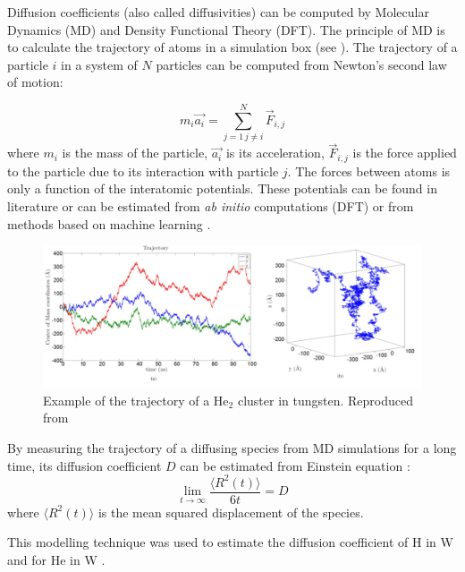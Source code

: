 Diffusion coefficients (also called diffusivities) can be computed by Molecular Dynamics (MD) and Density Functional Theory (DFT).
The principle of MD is to calculate the trajectory of atoms in a simulation box (see ).
The trajectory of a particle $i$ in a system of $N$ particles can be computed from Newton's second law of motion:

\begin{equation}
    m_i \vec{a_i} = \sum_{j=1 \, j \neq i}^N \vec{F}_{i,j}
\end{equation}
where $m_i$ is the mass of the particle, $\vec{a_i}$ is its acceleration, $\vec{F}_{i,j}$ is the force applied to the particle due to its interaction with particle $j$.
The forces between atoms is only a function of the interatomic potentials.
These potentials can be found in literature or can be estimated from \textit{ab initio} computations (DFT)  or from methods based on machine learning .

\begin{figure}
    \centering
    \includegraphics[width=\linewidth]{Figures/Chapter1/faney_md.jpg}
    \caption{Example of the trajectory of a He$_2$ cluster in tungsten. Reproduced from \cite{faney_numerical_2013}}
\end{figure}

By measuring the trajectory of a diffusing species from MD simulations for a long time, its diffusion coefficient $D$ can be estimated from Einstein equation \cite{einstein_uber_1905}:
\begin{equation}
    \lim_{t\to\infty} \frac{\langle R^2(t) \rangle}{6t} = D
\end{equation}
where $\langle R^2(t) \rangle$ is the mean squared displacement of the species.

This modelling technique was used to estimate the diffusion coefficient of H in W  and for He in W .


